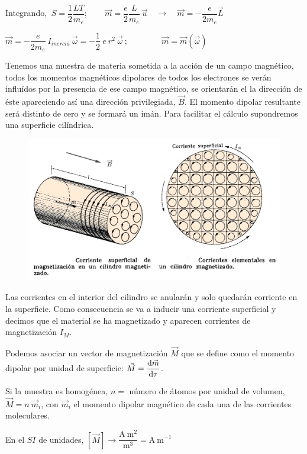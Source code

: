 Integrando, $\ S=\dfrac 1 2 \dfrac {L T}{m_e}; \qquad \vec m = \dfrac e 2 \dfrac L {m_e}\ \vec u \quad \to \quad \vec m = - \dfrac{e}{2m_e} \vec L$

$\vec m = - \dfrac {e}{2m_e} \ I_{inercia} \ \vec \omega= - \dfrac 1 2 \ e \ r^2 \ \vec \omega\ ; \qquad \qquad \vec m = \vec m ( \vec \omega  )$

Tenemos una muestra de materia sometida a la acción de un campo magnético, todos los momentos magnéticos dipolares de todos los electrones se verán influídos por la presencia de ese campo magnético, se orientarán el la dirección de éste apareciendo así una dirección privilegiada, $\vec B$. El momento dipolar resultante será distinto de cero y se formará un imán. Para facilitar el cálculo supondremos una superficie cilíndrica.

\begin{figure}[H]
	\centering
	\includegraphics[width=1.05\textwidth]{imagenes/imagenes27/T27IM09.png}
\end{figure}	

Las corrientes en el interior del cilindro se anularán y solo quedarán  corriente en la superficie.
Como consecuencia se va a inducir una corriente superficial y decimos que el material se ha magnetizado y aparecen corrientes de magnetización  $I_M$.

Podemos asociar un vector de magnetización $\vec M$ que se define como el momento dipolar por unidad de superficie: $\displaystyle \vec M=\dv{\vec m}{\tau}$.

Si la muestra es homogénea, $n=$ número de átomos por unidad de volumen, $\vec M = n\ \vec m_i$, con $\vec m_i$ el momento dipolar magnético de cada una de las corrientes moleculares.

En el $SI$ de unidades, $[\vec M] \to \dfrac { \mathrm{A} \ \mathrm{m}^2 } {\mathrm {m}^3} = \mathrm{A\ m}^{-1}$

